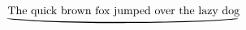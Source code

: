 \documentclass[12pt]{article}
\def\underparen#1{%
		\setbox0=\hbox{#1}%
		\stackrel{\box0}{\kern-\dp0\resizebox{\wd0}{\ht0}{\rotatebox{90}{(}}}}
\begin{document}
$\underparen{The quick brown fox jumped over the lazy dog}$
\end{document}
